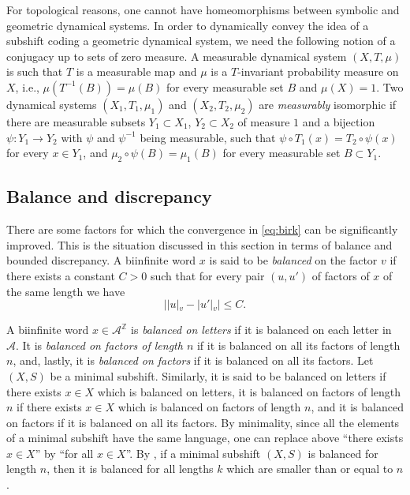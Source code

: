 \documentclass{article}
\theoremstyle{definition}
\newcommand{\Z}{\mathbb{Z}}
\begin{document}
For topological reasons, one cannot have  homeomorphisms between  symbolic and geometric  dynamical systems.
In order to  dynamically convey the idea of  a subshift coding a geometric  dynamical system, we need the following notion of a conjugacy  up to sets of zero measure.
A measurable dynamical system  $(X,T, \mu)$ is such that 
$T$ is a measurable map and $\mu$ is a $T$-invariant probability measure  on $X$,  i.e.,  $\mu(T^{-1}(B) )=\mu(B)$ for every measurable set $B$ and $\mu(X)=1$.
Two dynamical systems $(X_1,T_1,\mu_1)$ and $(X_2,T_2,\mu_2)$ are \emph{measurably}  isomorphic if there are measurable subsets $Y_1 \subset  X_1$, $Y_2 \subset  X_2$
of measure $1$ and a bijection $\psi \colon Y_1 \rightarrow Y_2$ with  $\psi$ and $\psi^{-1}$ being measurable, such that 
$\psi \circ T_1(x)= T_2 \circ \psi(x)$ for every $x \in Y_1$, and $\mu_2 \circ \psi(B)= \mu_1(B)$ for every measurable set $B \subset Y_1$.






 \subsection{Balance and discrepancy}\label{subsec:balance}
There are some factors for  which  the convergence in \eqref{eq:birk} can be significantly improved. This is the situation discussed in this section in terms
 of balance and bounded discrepancy.   
A biinfinite word $x$ is said to be {\em  balanced} on the factor $v$ if there exists a constant $C>0$ such that for every pair $(u,u')$ of factors of $x$ of  the same length we have $$| |u|_v-|u'|_v|\leq C.$$

A biinfinite word $x \in  {\mathcal A}^{\Z}$ is {\em balanced on letters} if it is balanced on each letter in  $\mathcal A$. It is  {\em balanced on factors of length $n$} if it is balanced on all its factors of length $n$, and, lastly, it is {\em balanced on factors} if it is balanced on all its factors. 
Let $(X,S)$ be a minimal subshift. Similarly, it is said to be  balanced on letters  if   there exists  $x\in X$  which is  balanced on  letters,
 it is balanced on factors of length $n$ if  there exists  $x\in X$ which is  balanced on   factors of length $n$, and  it is balanced on factors if it is balanced on all its factors.
By minimality, since all  the elements of a minimal subshift have the same language, one   can replace above  ``there exists $x \in X$''  by   ``for all $x \in X$''.
By \cite[Lemma 23]{Adam:03},  if   a minimal subshift $(X,S)$ is balanced for length $n$, then it is balanced for all lengths $k$ which are smaller than or equal to  $  n$.
 
\end{document}
